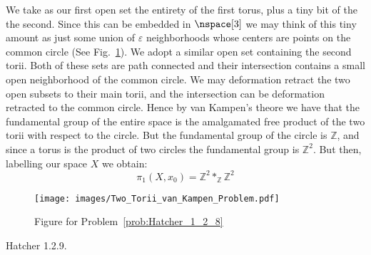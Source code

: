    \begin{solution}
        We take as our first open set the entirety of the first torus, plus a
        tiny bit of the the second. Since this can be embedded in $\nspace[3]$
        we may think of this tiny amount as just some union of $\varepsilon$
        neighborhoods whose centers are points on the common circle
        (See Fig.~\ref{fig:Fig_Prob_Hatcher_1_2_8a}). We adopt a similar open set
        containing the second torii. Both of these sets are path connected and
        their intersection contains a small open neighborhood of the common
        circle. We may deformation retract the two open subsets to their main
        torii, and the intersection can be deformation retracted to the common
        circle. Hence by van Kampen's theore we have that the fundamental group
        of the entire space is the amalgamated free product of the two torii
        with respect to the circle. But the fundamental group of the circle is
        $\mathbb{Z}$, and since a torus is the product of two circles the
        fundamental group is $\mathbb{Z}^{2}$. But then, labelling our space $X$
        we obtain:
        \begin{equation}
            \pi_{1}(X,x_{0})=\mathbb{Z}^{2}*_{\mathbb{Z}}\mathbb{Z}^{2}
        \end{equation}
        \begin{figure}[H]
            \centering
            \captionsetup{type=figure}
            \texttt{[image: images/Two\_Torii\_van\_Kampen\_Problem.pdf]}
            \caption{Figure for Problem~\ref{prob:Hatcher_1_2_8}}
            \label{fig:Fig_Prob_Hatcher_1_2_8a}
        \end{figure}
    \end{solution}
    \begin{problem}
        \label{prob:Hatcher_1_2_9}%
        Hatcher 1.2.9.
    \end{problem}

